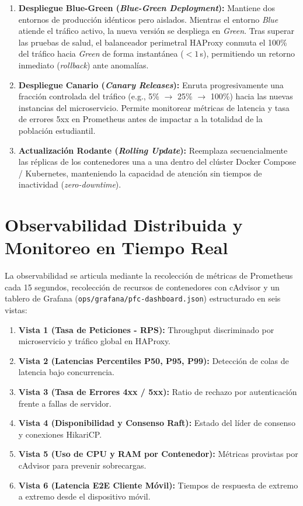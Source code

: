 \documentclass[11pt,a4paper]{article}
\begin{document}
\begin{enumerate}[leftmargin=*]
  \item \textbf{Despliegue Blue-Green (\textit{Blue-Green Deployment}):} Mantiene dos entornos de producci\'on id\'enticos pero aislados. Mientras el entorno \textit{Blue} atiende el tr\'afico activo, la nueva versi\'on se despliega en \textit{Green}. Tras superar las pruebas de salud, el balanceador perimetral HAProxy conmuta el 100\% del tr\'afico hacia \textit{Green} de forma instant\'anea ($< 1$\,s), permitiendo un retorno inmediato (\textit{rollback}) ante anomal\'ias.
  \item \textbf{Despliegue Canario (\textit{Canary Releases}):} Enruta progresivamente una fracci\'on controlada del tr\'afico (e.g., 5\% $\to$ 25\% $\to$ 100\%) hacia las nuevas instancias del microservicio. Permite monitorear m\'etricas de latencia y tasa de errores 5xx en Prometheus antes de impactar a la totalidad de la poblaci\'on estudiantil.
  \item \textbf{Actualizaci\'on Rodante (\textit{Rolling Update}):} Reemplaza secuencialmente las r\'eplicas de los contenedores una a una dentro del cl\'uster Docker Compose / Kubernetes, manteniendo la capacidad de atenci\'on sin tiempos de inactividad (\textit{zero-downtime}).
\end{enumerate}

\newpage

\section{Observabilidad Distribuida y Monitoreo en Tiempo Real}
\label{sec:observabilidad}
La observabilidad se articula mediante la recolecci\'on de m\'etricas de Prometheus cada 15 segundos, recolecci\'on de recursos de contenedores con cAdvisor y un tablero de Grafana (\texttt{ops/\allowbreak grafana/\allowbreak pfc-dashboard.json}) estructurado en seis vistas:

\begin{enumerate}
  \item \textbf{Vista 1 (Tasa de Peticiones - RPS):} Throughput discriminado por microservicio y tr\'afico global en HAProxy.
  \item \textbf{Vista 2 (Latencias Percentiles P50, P95, P99):} Detecci\'on de colas de latencia bajo concurrencia.
  \item \textbf{Vista 3 (Tasa de Errores 4xx / 5xx):} Ratio de rechazo por autenticaci\'on frente a fallas de servidor.
  \item \textbf{Vista 4 (Disponibilidad y Consenso Raft):} Estado del l\'ider de consenso y conexiones HikariCP.
  \item \textbf{Vista 5 (Uso de CPU y RAM por Contenedor):} M\'etricas provistas por cAdvisor para prevenir sobrecargas.
  \item \textbf{Vista 6 (Latencia E2E Cliente M\'ovil):} Tiempos de respuesta de extremo a extremo desde el dispositivo m\'ovil.
\end{enumerate}
\end{document}
